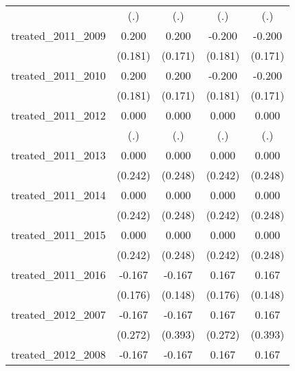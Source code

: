 {\begin{tabular}{l*{4}{c}}
            &         (.)         &         (.)         &         (.)         &         (.)         \\
[1em]
treated\_2011\_2009&       0.200         &       0.200         &      -0.200         &      -0.200         \\
            &     (0.181)         &     (0.171)         &     (0.181)         &     (0.171)         \\
[1em]
treated\_2011\_2010&       0.200         &       0.200         &      -0.200         &      -0.200         \\
            &     (0.181)         &     (0.171)         &     (0.181)         &     (0.171)         \\
[1em]
treated\_2011\_2012&       0.000         &       0.000         &       0.000         &       0.000         \\
            &         (.)         &         (.)         &         (.)         &         (.)         \\
[1em]
treated\_2011\_2013&       0.000         &       0.000         &       0.000         &       0.000         \\
            &     (0.242)         &     (0.248)         &     (0.242)         &     (0.248)         \\
[1em]
treated\_2011\_2014&       0.000         &       0.000         &       0.000         &       0.000         \\
            &     (0.242)         &     (0.248)         &     (0.242)         &     (0.248)         \\
[1em]
treated\_2011\_2015&       0.000         &       0.000         &       0.000         &       0.000         \\
            &     (0.242)         &     (0.248)         &     (0.242)         &     (0.248)         \\
[1em]
treated\_2011\_2016&      -0.167         &      -0.167         &       0.167         &       0.167         \\
            &     (0.176)         &     (0.148)         &     (0.176)         &     (0.148)         \\
[1em]
treated\_2012\_2007&      -0.167         &      -0.167         &       0.167         &       0.167         \\
            &     (0.272)         &     (0.393)         &     (0.272)         &     (0.393)         \\
[1em]
treated\_2012\_2008&      -0.167         &      -0.167         &       0.167         &       0.167         \\

\end{tabular}}
